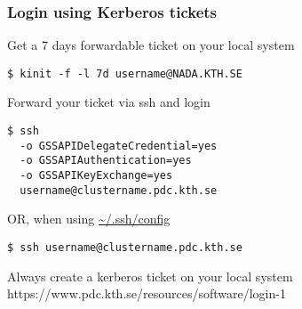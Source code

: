 \begin{frame}[fragile]
\frametitle{Login using Kerberos tickets}

\begin{block}{Get a 7 days forwardable ticket on your local system}
\begin{verbatim}
$ kinit -f -l 7d username@NADA.KTH.SE
\end{verbatim}
\end{block}

\begin{block}{Forward your ticket via ssh and login}
\begin{verbatim}
$ ssh
  -o GSSAPIDelegateCredential=yes
  -o GSSAPIAuthentication=yes
  -o GSSAPIKeyExchange=yes
  username@clustername.pdc.kth.se
\end{verbatim}
\end{block}

\begin{block}{OR, when using \url{~/.ssh/config}}
\begin{verbatim}
$ ssh username@clustername.pdc.kth.se
\end{verbatim}
\end{block}

\alert{Always create a kerberos ticket on your local system}
\alert{https://www.pdc.kth.se/resources/software/login-1}
\end{frame}

